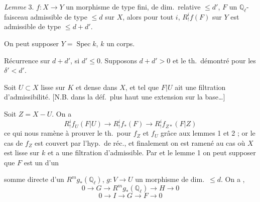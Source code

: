 \documentclass[11pt,a4paper]{article}
\begin{document}
\emph{Lemme}  3.  $f\colon X \to Y$ un  morphisme de type fini, de dim.\ relative $\leq d'$, $F$ un $\mathbb{Q}_{\ell}$-faisceau admissible de type $\leq d$ sur $X$, alors pour tout $i$, $R^{i}_{!}f(F)$ sur $Y$ est admissible de type $\leq d+d'$.

On peut supposer $Y = \operatorname{Spec} k$, $k$ un corps.

Récurrence sur $d+d'$,  si $d' \leq 0$. Supposons $d+d' > 0$ et le th.\ démontré pour les \struck{\ill{}} $\delta' < d'$.

Soit $U \subset X$  lisse sur $K$ et dense dans $X$, et tel que $F|U$ ait une filtration d'admissibilité.
[N.B.    dans la déf.\ plus haut  une extension  sur la base…]

Soit $Z = X - U$. On a
\[
R^{i}_{!}f_{U}(F|U) \to R^{i}_{!}f_{*}(F) \to R^{i}_{!}f_{Z*}(F|Z)
\]
ce qui nous ramène à prouver le th.\ pour $f_{Z}$ et $f_{U}$ grâce aux lemmes 1 et 2 ; or le cas de $f_{Z}$ est couvert par l'hyp.\ de réc., et \struck{\ill{}} finalement on est ramené au cas où $X$ est lisse sur $k$ et a une filtration d'admissible. Par  et le lemme 1 on peut supposer que $F$ est  un  d'un

somme directe  d'un \ill{} $R^{m}g_{*}(\mathbb{Q}_{\ell})$, \ill{} $g\colon V \to U$ un morphisme  de  dim.\ $\leq d$. On a \ill{} \ill{} \ill{},   
\[
0 \to G \to R^{m}g_{*}(\mathbb{Q}_{\ell}) \to H \to 0
\]
\[
0 \to I \to G \to F \to 0
\]
\end{document}
